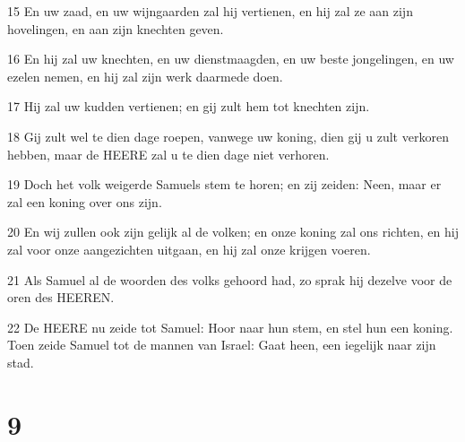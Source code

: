 \par 15 En uw zaad, en uw wijngaarden zal hij vertienen, en hij zal ze aan zijn hovelingen, en aan zijn knechten geven.
\par 16 En hij zal uw knechten, en uw dienstmaagden, en uw beste jongelingen, en uw ezelen nemen, en hij zal zijn werk daarmede doen.
\par 17 Hij zal uw kudden vertienen; en gij zult hem tot knechten zijn.
\par 18 Gij zult wel te dien dage roepen, vanwege uw koning, dien gij u zult verkoren hebben, maar de HEERE zal u te dien dage niet verhoren.
\par 19 Doch het volk weigerde Samuels stem te horen; en zij zeiden: Neen, maar er zal een koning over ons zijn.
\par 20 En wij zullen ook zijn gelijk al de volken; en onze koning zal ons richten, en hij zal voor onze aangezichten uitgaan, en hij zal onze krijgen voeren.
\par 21 Als Samuel al de woorden des volks gehoord had, zo sprak hij dezelve voor de oren des HEEREN.
\par 22 De HEERE nu zeide tot Samuel: Hoor naar hun stem, en stel hun een koning. Toen zeide Samuel tot de mannen van Israel: Gaat heen, een iegelijk naar zijn stad.

\chapter{9}

